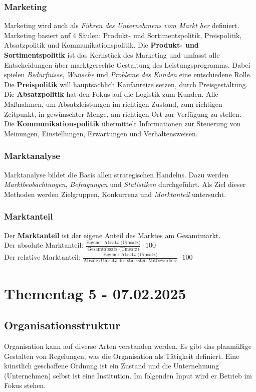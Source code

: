 \documentclass[]{article}
\begin{document}
\subsubsection{Marketing}
Marketing wird auch als \textit{Führen des Unternehmens vom Markt her} definiert. Marketing basiert auf 4 Säulen: Produkt- und Sortimentspolitik, Preispolitik, Absatzpolitik und Kommunikationspolitik.
Die \textbf{Produkt- und Sortimentspolitik} ist das Kernstück des Marketing und umfasst alle Entscheidungen über marktgerechte Gestaltung des Leistungsprogramms. Dabei spielen \textit{Bedürfnisse}, \textit{Wünsche} und \textit{Probleme des Kunden} eine entschiedene Rolle.\\
Die \textbf{Preispolitik} will hauptsächlich Kaufanreize setzen, durch Preisgestaltung.\\
Die \textbf{Absatzpolitik} hat den Fokus auf die Logistik zum Kunden. Alle Maßnahmen, um Absatzleistungen im richtigen Zustand, zum richtigen Zeitpunkt, in gewünschter Menge, am richtigen Ort zur Verfügung zu stellen.\\
Die \textbf{Kommunikationspolitik} übermittelt Informationen zur Steuerung von Meinungen, Einstellungen, Erwartungen und Verhaltensweisen.

\subsubsection{Marktanalyse}
Marktanalyse bildet die Basis allen strategischen Handelns. Dazu werden \textit{Marktbeobachtungen}, \textit{Befragungen} und \textit{Statistiken} durchgeführt. Als Ziel dieser Methoden werden Zielgruppen, Konkurrenz und \textit{Marktanteil} untersucht.
\subsubsection{Marktanteil}
Der \textbf{Marktanteil} ist der eigene Anteil des Marktes am Gesamtmarkt. \\
Der absolute Marktanteil: $\frac{\text{Eigener Absatz (Umsatz)}}{\text{Gesamtabsatz (Umsatz)}} \cdot 100$\\
Der relative Marktanteil: $\frac{\text{Eigener Absatz (Umsatz)}}{\text{Absatz/Umsatz des stärksten Mitbewerbers}} \cdot 100$

\newpage
\section{Thementag 5 - 07.02.2025}

\subsection{Organisationsstruktur}
Organisation kann auf diverse Arten verstanden werden. Es gibt das planmäßige Gestalten von Regelungen, was die Organisation als Tätigkeit definiert. Eine künstlich geschaffene Ordnung ist ein Zustand und die Unternehmung (Unternehmen) selbst ist eine Institution. Im folgenden Input wird er Betrieb im Fokus stehen.
\end{document}
